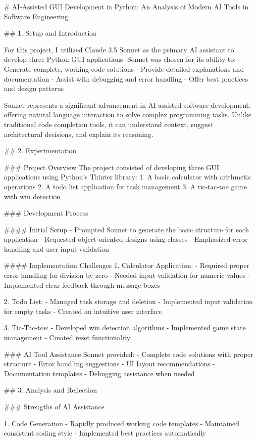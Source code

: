 # AI-Assisted GUI Development in Python: An Analysis of Modern AI Tools in Software Engineering

## 1. Setup and Introduction

For this project, I utilized Claude 3.5 Sonnet as the primary AI assistant to develop three Python GUI applications. Sonnet was chosen for its ability to:
- Generate complete, working code solutions
- Provide detailed explanations and documentation
- Assist with debugging and error handling
- Offer best practices and design patterns

Sonnet represents a significant advancement in AI-assisted software development, offering natural language interaction to solve complex programming tasks. Unlike traditional code completion tools, it can understand context, suggest architectural decisions, and explain its reasoning.

## 2. Experimentation

### Project Overview
The project consisted of developing three GUI applications using Python's Tkinter library:
1. A basic calculator with arithmetic operations
2. A todo list application for task management
3. A tic-tac-toe game with win detection

### Development Process

#### Initial Setup
- Prompted Sonnet to generate the basic structure for each application
- Requested object-oriented designs using classes
- Emphasized error handling and user input validation

#### Implementation Challenges
1. Calculator Application:
   - Required proper error handling for division by zero
   - Needed input validation for numeric values
   - Implemented clear feedback through message boxes

2. Todo List:
   - Managed task storage and deletion
   - Implemented input validation for empty tasks
   - Created an intuitive user interface

3. Tic-Tac-toe:
   - Developed win detection algorithms
   - Implemented game state management
   - Created reset functionality

### AI Tool Assistance
Sonnet provided:
- Complete code solutions with proper structure
- Error handling suggestions
- UI layout recommendations
- Documentation templates
- Debugging assistance when needed

## 3. Analysis and Reflection

### Strengths of AI Assistance

1. Code Generation
   - Rapidly produced working code templates
   - Maintained consistent coding style
   - Implemented best practices automatically

